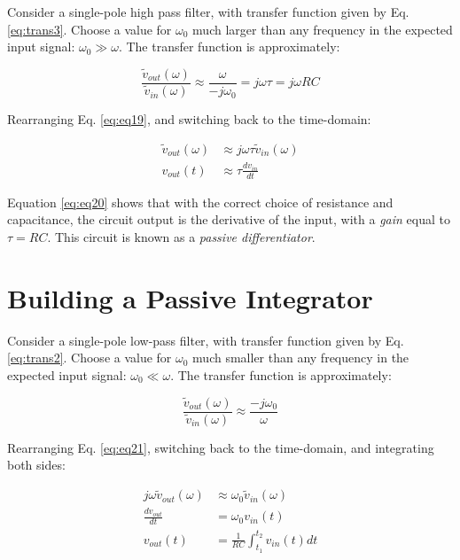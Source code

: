 \documentclass[12pt]{article}
\begin{document}
Consider a single-pole high pass filter, with transfer function given by Eq. \ref{eq:trans3}.  Choose a value for $\omega_0$ much larger than any frequency in the expected input signal: $\omega_0 \gg \omega$.  The transfer function is approximately:

\begin{equation}
\frac{\tilde{v}_{out}(\omega)}{\tilde{v}_{in}(\omega)} \approx \frac{\omega}{-j\omega_0} = j\omega \tau = j\omega RC
\label{eq:eq19}
\end{equation}

Rearranging Eq. \ref{eq:eq19}, and switching back to the time-domain:

\begin{align}
\tilde{v}_{out}(\omega) &\approx j\omega \tau \tilde{v}_{in}(\omega) \\
v_{out}(t) &\approx \tau \frac{dv_{in}}{dt}
\label{eq:eq20}
\end{align}

Equation \ref{eq:eq20} shows that with the correct choice of resistance and capacitance, the circuit output is the derivative of the input, with a \textit{gain} equal to $\tau = RC$.  This circuit is known as a \textit{passive differentiator}.

\section{Building a Passive Integrator}

Consider a single-pole low-pass filter, with transfer function given by Eq. \ref{eq:trans2}.  Choose a value for $\omega_0$ much smaller than any frequency in the expected input signal: $\omega_0 \ll \omega$.  The transfer function is approximately:

\begin{equation}
\frac{\tilde{v}_{out}(\omega)}{\tilde{v}_{in}(\omega)} \approx \frac{-j\omega_0}{\omega}
\label{eq:eq21}
\end{equation}

Rearranging Eq. \ref{eq:eq21}, switching back to the time-domain, and integrating both sides:

\begin{align}
j\omega \tilde{v}_{out}(\omega) &\approx \omega_0 \tilde{v}_{in}(\omega) \\
\frac{dv_{out}}{dt} &= \omega_0 v_{in}(t) \\
v_{out}(t) &= \frac{1}{RC} \int_{t_1}^{t_2} v_{in}(t) dt
\label{eq:eq22}
\end{align}
\end{document}

